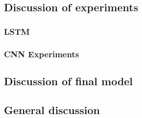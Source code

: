 \subsection{Discussion of experiments}
\subsubsection{LSTM}

\subsubsection{CNN Experiments}


\subsection{Discussion of final model}
\subsection{General discussion}
